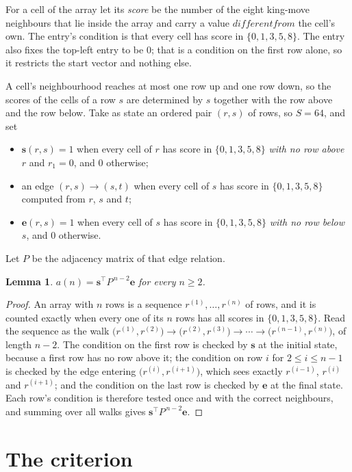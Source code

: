 \documentclass[11pt,a4paper]{article}
\theoremstyle{plain}
\newtheorem{lemma}[theorem]{Lemma}
\theoremstyle{definition}
\begin{document}
For a cell of the array let its \emph{score} be the number of the eight king-move neighbours that lie inside
the array and carry a value $different from$ the cell's own. The entry's condition is that every cell
has score in $\{0,1,3,5,8\}$. The entry also fixes the top-left entry to be $0$; that is a condition on the first row alone, so it restricts the start vector and nothing else.

A cell's neighbourhood reaches at most one row up and one row down, so the scores of the
cells of a row $s$ are determined by $s$ together with the row above and the row below.
Take as state an ordered pair $(r,s)$ of rows, so $S=64$, and set
\begin{itemize}
\item $\mathbf{s}(r,s)=1$ when every cell of $r$ has score in $\{0,1,3,5,8\}$ \emph{with no row
above $r$} and $r_1=0$, and $0$ otherwise;
\item an edge $(r,s)\to(s,t)$ when every cell of $s$ has score in $\{0,1,3,5,8\}$ computed from
$r$, $s$ and $t$;
\item $\mathbf{e}(r,s)=1$ when every cell of $s$ has score in $\{0,1,3,5,8\}$ \emph{with no row
below $s$}, and $0$ otherwise.
\end{itemize}
Let $P$ be the adjacency matrix of that edge relation.

\begin{lemma}\label{lem:walk}
$a(n)=\mathbf{s}^{\!\top}P^{\,n-2}\mathbf{e}$ for every $n\ge2$.
\end{lemma}

\begin{proof}
An array with $n$ rows is a sequence $r^{(1)},\dots,r^{(n)}$ of rows, and it is counted
exactly when every one of its $n$ rows has all scores in $\{0,1,3,5,8\}$. Read the sequence as the
walk $\bigl(r^{(1)},r^{(2)}\bigr)\to\bigl(r^{(2)},r^{(3)}\bigr)\to\cdots\to
\bigl(r^{(n-1)},r^{(n)}\bigr)$, of length $n-2$. The condition on the first row is
checked by $\mathbf{s}$ at the initial state, because a first row has no row above it; the
condition on row $i$ for $2\le i\le n-1$ is checked by the edge entering
$\bigl(r^{(i)},r^{(i+1)}\bigr)$, which sees exactly $r^{(i-1)}$, $r^{(i)}$ and
$r^{(i+1)}$; and the condition on the last row is checked by $\mathbf{e}$ at the final
state. Each row's condition is therefore tested once and with the correct neighbours, and
summing over all walks gives $\mathbf{s}^{\!\top}P^{\,n-2}\mathbf{e}$.
\end{proof}

\section{The criterion}
\end{document}
